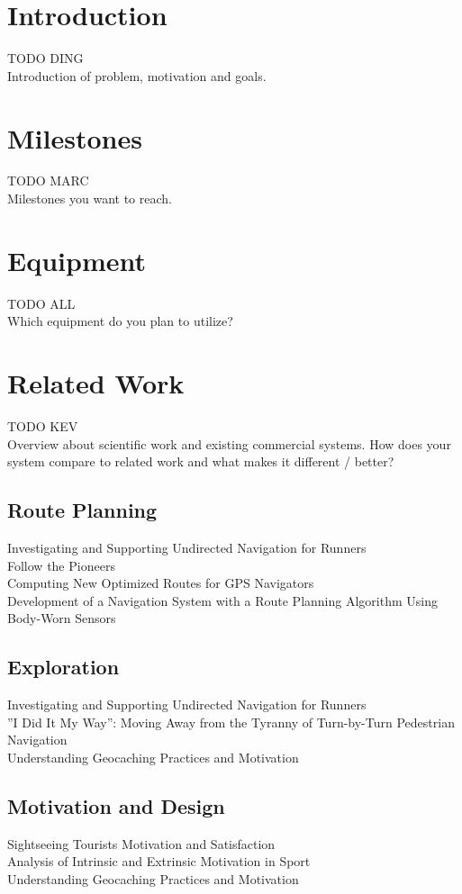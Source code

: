 \documentclass{sigchi}
\begin{document}
\section{Introduction}
TODO DING\\
Introduction of problem, motivation and goals.

\section{Milestones}
TODO MARC\\
Milestones you want to reach.

\section{Equipment}
TODO ALL\\
Which equipment do you plan to utilize?

\section{Related Work}
TODO KEV\\
Overview about scientific work and existing commercial systems. How does your system compare to related work and what makes it different / better?
\subsection{Route Planning}
Investigating and Supporting Undirected Navigation for Runners \cite{undirectedrunnernav}\\
Follow the Pioneers \cite{followthepioneers} \\
Computing New Optimized Routes for GPS Navigators \cite{evolutionaryalgonav} \\
Development of a Navigation System with a Route Planning Algorithm Using Body-Worn Sensors \cite{routeplanningbodywornsensors} 
\subsection{Exploration}
Investigating and Supporting Undirected Navigation for Runners \cite{undirectedrunnernav} \\
''I Did It My Way'': Moving Away from the Tyranny of Turn-by-Turn Pedestrian Navigation \cite{ididitmyway} \\
Understanding Geocaching Practices and Motivation \cite{o2008understanding} \\
\subsection{Motivation and Design}
Sightseeing Tourists Motivation and Satisfaction \cite{DUNNROSS1991226} \\
Analysis of Intrinsic and Extrinsic Motivation in Sport \cite{vallerand1999integrative} \\
Understanding Geocaching Practices and Motivation \cite{o2008understanding} \\
\end{document}
